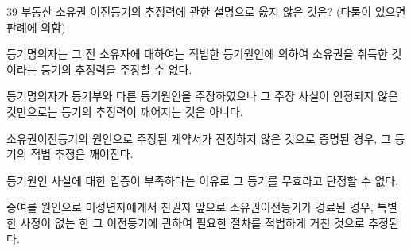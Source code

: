 \begin{question}{39}
부동산 소유권 이전등기의 추정력에 관한 설명으로 옳지 않은 것은? (다툼이 있으면 판례에 의함)
\begin{choices}
  \item 등기명의자는 그 전 소유자에 대하여는 적법한 등기원인에 의하여 소유권을 취득한 것이라는 등기의 추정력을 주장할 수 없다.
  \item 등기명의자가 등기부와 다른 등기원인을 주장하였으나 그 주장 사실이 인정되지 않은 것만으로는 등기의 추정력이 깨어지는 것은 아니다.
  \item 소유권이전등기의 원인으로 주장된 계약서가 진정하지 않은 것으로 증명된 경우, 그 등기의 적법 추정은 깨어진다.
  \item 등기원인 사실에 대한 입증이 부족하다는 이유로 그 등기를 무효라고 단정할 수 없다.
  \item 증여를 원인으로 미성년자에게서 친권자 앞으로 소유권이전등기가 경료된 경우, 특별한 사정이 없는 한 그 이전등기에 관하여 필요한 절차를 적법하게 거친 것으로 추정된다.
\end{choices}
\end{question}
